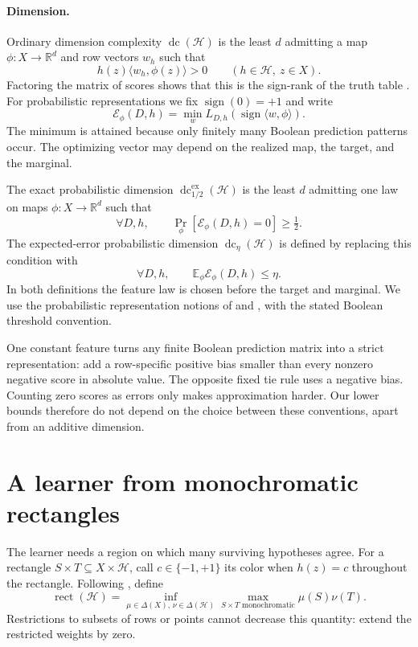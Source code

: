 \documentclass[11pt,letterpaper,pmlr,twoside]{jmlr}
\newcommand{\Hc}{\mathcal H}
\newcommand{\E}{\mathbb E}
\newcommand{\R}{\mathbb R}
\newcommand{\sgn}{\operatorname{sign}}
\newcommand{\dc}{\operatorname{dc}}
\newcommand{\edc}{\operatorname{dc}^{\mathrm{ex}}_{1/2}}
\newcommand{\rect}{\operatorname{rect}}
\newcommand{\ip}[2]{\langle #1,#2\rangle}
\begin{document}
\paragraph{Dimension.}
Ordinary dimension complexity $\dc(\Hc)$ is the least $d$ admitting a map $\phi:X\to\R^d$ and row vectors $w_h$ such that
\begin{equation}
 h(z)\ip{w_h}{\phi(z)}>0\qquad(h\in\Hc,\ z\in X).
 \label{eq:dcdef}
\end{equation}
Factoring the matrix of scores shows that this is the sign-rank of the truth table \citep{BES02}. For probabilistic representations we fix $\sgn(0)=+1$ and write
\[
 \mathcal E_\phi(D,h)=\min_w L_{D,h}(\sgn\ip{w}{\phi}).
\]
The minimum is attained because only finitely many Boolean prediction patterns occur. The optimizing vector may depend on the realized map, the target, and the marginal.

The exact probabilistic dimension $\edc(\Hc)$ is the least $d$ admitting one law on maps $\phi:X\to\R^d$ such that
\begin{equation}
 \forall D,h,\qquad \Pr_\phi[\mathcal E_\phi(D,h)=0]\ge\tfrac12.
 \label{eq:exactprob}
\end{equation}
The expected-error probabilistic dimension $\dc_\eta(\Hc)$ is defined by replacing this condition with
\begin{equation}
 \forall D,h,\qquad \E_\phi\mathcal E_\phi(D,h)\le\eta.
 \label{eq:avgprob}
\end{equation}
In both definitions the feature law is chosen before the target and marginal. We use the probabilistic representation notions of \citet{CMW25} and \citet{KMS20}, with the stated Boolean threshold convention.

\begin{remark}\label{rem:ties}
One constant feature turns any finite Boolean prediction matrix into a strict representation: add a row-specific positive bias smaller than every nonzero negative score in absolute value. The opposite fixed tie rule uses a negative bias. Counting zero scores as errors only makes approximation harder. Our lower bounds therefore do not depend on the choice between these conventions, apart from an additive dimension.
\end{remark}

\section{A learner from monochromatic rectangles}\label{sec:rectangle}
The learner needs a region on which many surviving hypotheses agree. For a rectangle $S\times T\subseteq X\times\Hc$, call $c\in\{-1,+1\}$ its color when $h(z)=c$ throughout the rectangle. Following \citet{HHPTZ22}, define
\begin{equation}
 \rect(\Hc)=\inf_{\mu\in\Delta(X),\,\nu\in\Delta(\Hc)}
 \max_{S\times T\text{ monochromatic}}\mu(S)\nu(T).
 \label{eq:rectdef}
\end{equation}
Restrictions to subsets of rows or points cannot decrease this quantity: extend the restricted weights by zero.
\end{document}
